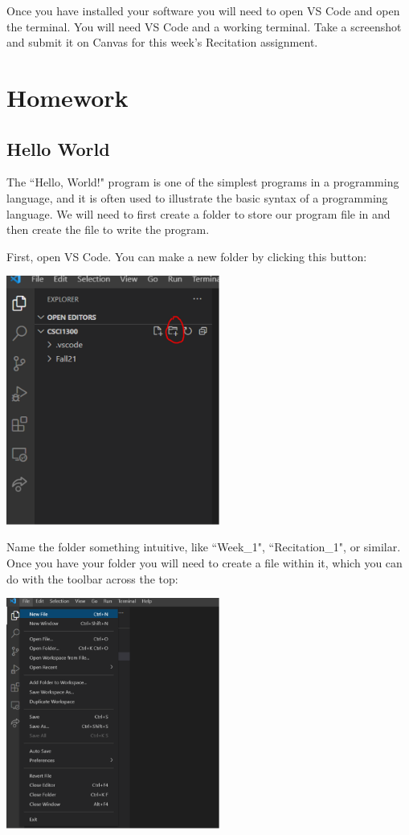 Once you have installed your software you will need to open VS Code and open the terminal. You will need VS Code and a working terminal. Take a screenshot and submit it on Canvas for this week's Recitation assignment. 

\section{Homework}

\subsection{Hello World}


The ``Hello, World!" program is one of the simplest programs in a programming language, and it is often used to illustrate the basic syntax of a programming language. We will need to first create a folder to store our program file in and then create the file to write the program.

First, open VS Code. You can make a new folder by clicking this button: 

\includegraphics[width=7cm]{images/hello_world_2.png}

Name the folder something intuitive, like ``Week\_1", ``Recitation\_1", or similar. Once you have your folder you will need to create a file within it, which you can do with the toolbar across the top:

\includegraphics[width=7cm]{images/hello_world_4.png}

